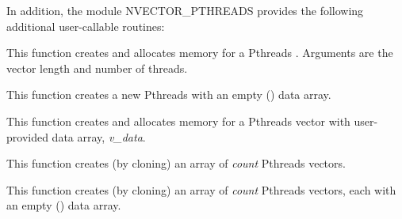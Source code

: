 \documentclass[letterpaper,10pt,english]{sphinxmanual}
\begin{document}
In addition, the module NVECTOR\_PTHREADS provides the following
additional user-callable routines:

\begin{fulllineitems}
\label{nvectors/NVector_Pthreads:c.N_VNew_Pthreads}
This function creates and allocates memory for a Pthreads
. Arguments are the vector length and number of threads.

\end{fulllineitems}


\begin{fulllineitems}
\label{nvectors/NVector_Pthreads:c.N_VNewEmpty_Pthreads}
This function creates a new Pthreads  with an empty
() data array.

\end{fulllineitems}


\begin{fulllineitems}
\label{nvectors/NVector_Pthreads:c.N_VMake_Pthreads}
This function creates and allocates memory for a Pthreads vector with
user-provided data array, \emph{v\_data}.

\end{fulllineitems}


\begin{fulllineitems}
\label{nvectors/NVector_Pthreads:c.N_VCloneVectorArray_Pthreads}
This function creates (by cloning) an array of \emph{count} Pthreads
vectors.

\end{fulllineitems}


\begin{fulllineitems}
\label{nvectors/NVector_Pthreads:c.N_VCloneEmptyVectorArray_Pthreads}
This function creates (by cloning) an array of \emph{count} Pthreads
vectors, each with an empty () data array.

\end{fulllineitems}
\end{document}
